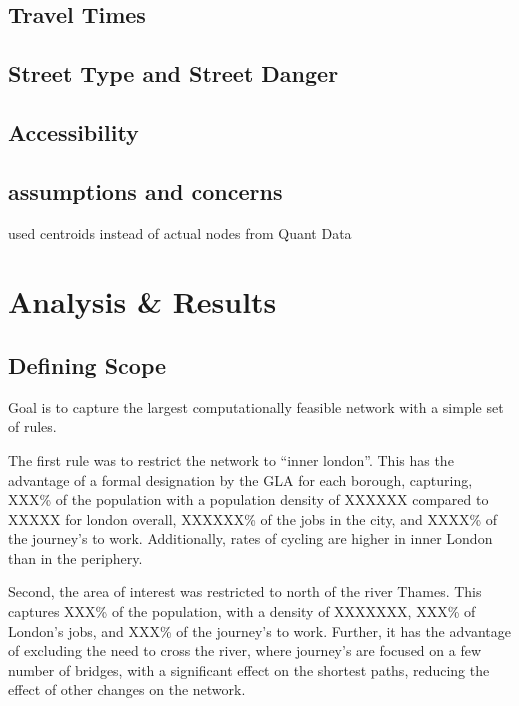 \documentclass[11pt]{article} %
\begin{document}
\subsection{Travel Times}

\subsection{Street Type and Street Danger}

\subsection{Accessibility}

\subsection{assumptions and concerns}

used centroids instead of actual nodes from Quant Data


\section{Analysis \& Results}

\subsection{Defining Scope}

Goal is to capture the largest computationally feasible network with a simple set of rules. 

The first rule was to restrict the network to ``inner london''. This has the advantage of a formal designation by the GLA for each borough, capturing, XXX\% of the population with a population density of XXXXXX compared to XXXXX for london overall, XXXXXX\% of the jobs in the city, and XXXX\% of the journey's to work. Additionally, rates of cycling are higher in inner London than in the periphery. 

Second, the area of interest was restricted to north of the river Thames. This captures XXX\% of the population, with a density of XXXXXXX, XXX\% of London's jobs, and XXX\% of the journey's to work. Further, it has the advantage of excluding the need to cross the river, where journey's are focused on a few number of bridges, with a significant effect on the shortest paths, reducing the effect of other changes on the network. 
\end{document}
